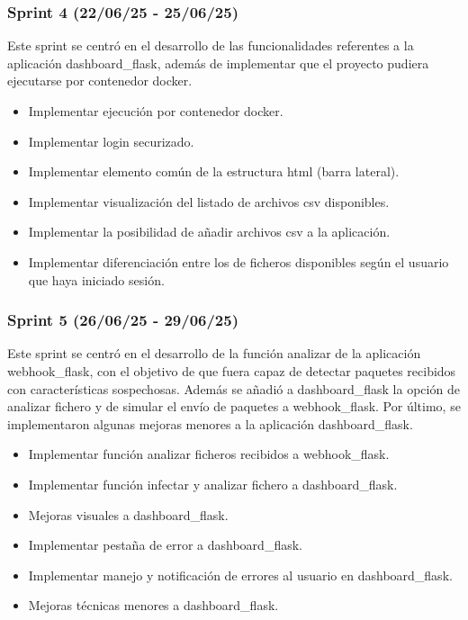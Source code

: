 
\subsubsection{Sprint 4 (22/06/25 - 25/06/25)}
Este sprint se centró en el desarrollo de las funcionalidades referentes a la aplicación dashboard\_flask, además de implementar que el proyecto pudiera ejecutarse por contenedor docker.

\begin{itemize}
    \item Implementar ejecución por contenedor docker.
    \item Implementar login securizado.
    \item Implementar elemento común de la estructura html (barra lateral).
    \item Implementar visualización del listado de archivos csv disponibles.
    \item Implementar la posibilidad de añadir archivos csv a la aplicación.
    \item Implementar diferenciación entre los de ficheros disponibles según el usuario que haya iniciado sesión.
\end{itemize}

\subsubsection{Sprint 5 (26/06/25 - 29/06/25)}
Este sprint se centró en el desarrollo de la función analizar de la aplicación webhook\_flask, con el objetivo de que fuera capaz de detectar paquetes recibidos con características sospechosas. Además se añadió a dashboard\_flask la opción de analizar fichero y de simular el envío de paquetes a webhook\_flask.
Por último, se implementaron algunas mejoras menores a la aplicación dashboard\_flask.

\begin{itemize}
    \item Implementar función analizar ficheros recibidos a webhook\_flask.
    \item Implementar función infectar y analizar fichero a dashboard\_flask.
    \item Mejoras visuales a dashboard\_flask.
    \item Implementar pestaña de error a dashboard\_flask.
    \item Implementar manejo y notificación de errores al usuario en dashboard\_flask.
    \item Mejoras técnicas menores a dashboard\_flask.
\end{itemize}

